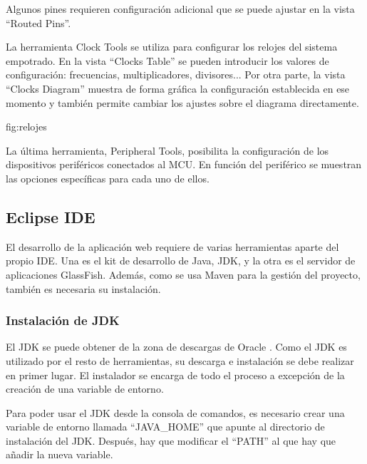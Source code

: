 
Algunos pines requieren configuración adicional que se puede ajustar en la vista
``Routed Pins''.


La herramienta Clock Tools se utiliza para configurar los relojes del sistema
empotrado. En la vista ``Clocks Table'' se pueden introducir los valores de
configuración: frecuencias, multiplicadores, divisores... Por otra parte, la
vista ``Clocks Diagram'' muestra de forma gráfica la configuración establecida
en ese momento y también permite cambiar los ajustes sobre el diagrama
directamente.

{fig:relojes}{}

La última herramienta, Peripheral Tools, posibilita la configuración de los
dispositivos periféricos conectados al MCU. En función del periférico se
muestran las opciones específicas para cada uno de ellos.



\subsection{Eclipse IDE} \label{sec:man-dev-eclipse}
El desarrollo de la aplicación web requiere de varias herramientas aparte
del propio IDE. Una es el kit de desarrollo de Java, JDK, y la otra es el
servidor de aplicaciones GlassFish. Además, como se usa Maven para la gestión
del proyecto, también es necesaria su instalación.

\subsubsection{Instalación de JDK} \label{sec:jdk}
El JDK se puede obtener de la zona de descargas de Oracle \cite{webpage:javaee}.
Como el JDK es utilizado por el resto de herramientas, su descarga e instalación
se debe realizar en primer lugar. El instalador se encarga de todo el proceso a
excepción de la creación de una variable de entorno.

Para poder usar el JDK desde la consola de comandos, es necesario crear
una variable de entorno llamada ``JAVA\_HOME'' que apunte al directorio de
instalación del JDK. Después, hay que modificar el ``PATH'' al que hay
que añadir la nueva variable.

